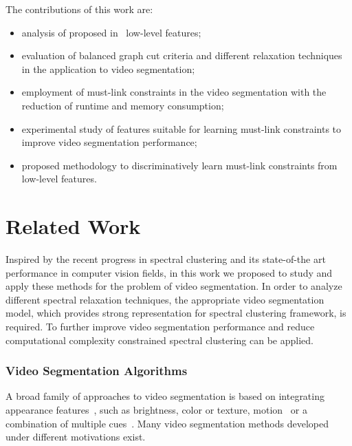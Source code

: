 The contributions of this work are:
\begin{itemize}
\item analysis of proposed in~\cite{GalassoCS12} low-level features;
\item evaluation of balanced graph cut criteria and different relaxation techniques in the application to video segmentation;
\item employment of must-link constraints in the video segmentation with the reduction of runtime and memory consumption;
\item experimental study of features suitable for learning must-link constraints to improve video segmentation performance;
\item proposed methodology to discriminatively learn must-link constraints from low-level features. 
\end{itemize}

\section{Related Work}

Inspired by the recent progress in spectral clustering and its state-of-the art performance in computer vision fields, in this work we proposed to study and apply these methods for the problem of video segmentation. 
In order to analyze different spectral relaxation techniques, the appropriate video segmentation model, which provides strong representation for spectral clustering framework, is required.
To further improve video segmentation performance and reduce computational complexity constrained spectral clustering can be applied.
\subsubsection*{Video Segmentation Algorithms}
A broad family of approaches to video segmentation is based on integrating appearance features~\cite{Brendel09,Grundmann10,Vazquez_Reina10,XuXiong12}, such as brightness, color or texture, 
motion~\cite{Shi00,Brox10,Galasso11} or a combination of multiple cues~\cite{Dementhon02,Kannan05,Kumar08,Paris08,Lezama11,Ochs11,GalassoCS12,Ochs14}. 
Many video segmentation methods developed under different motivations exist. 

